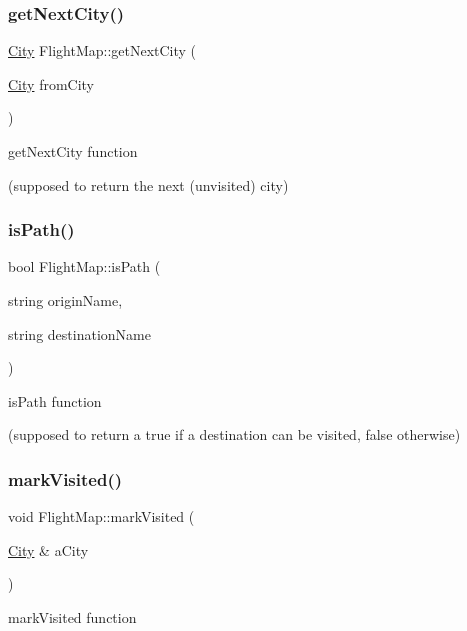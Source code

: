 \subsubsection{\texorpdfstring{get\+Next\+City()}{getNextCity()}}
{\footnotesize\ttfamily \hyperlink{class_city}{City} Flight\+Map\+::get\+Next\+City (\begin{DoxyParamCaption}\item[{\hyperlink{class_city}{City}}]{from\+City }\end{DoxyParamCaption})}



get\+Next\+City function 

(supposed to return the next (unvisited) city) \hypertarget{class_flight_map_a10c5a85d074c3251185a5209a2751a09}{}\label{class_flight_map_a10c5a85d074c3251185a5209a2751a09} 
\subsubsection{\texorpdfstring{is\+Path()}{isPath()}}
{\footnotesize\ttfamily bool Flight\+Map\+::is\+Path (\begin{DoxyParamCaption}\item[{string}]{origin\+Name,  }\item[{string}]{destination\+Name }\end{DoxyParamCaption})}



is\+Path function 

(supposed to return a true if a destination can be visited, false otherwise) \hypertarget{class_flight_map_ab6e4b49626a2ea60788e67d851cd721a}{}\label{class_flight_map_ab6e4b49626a2ea60788e67d851cd721a} 
\subsubsection{\texorpdfstring{mark\+Visited()}{markVisited()}}
{\footnotesize\ttfamily void Flight\+Map\+::mark\+Visited (\begin{DoxyParamCaption}\item[{\hyperlink{class_city}{City} \&}]{a\+City }\end{DoxyParamCaption})}



mark\+Visited function 


